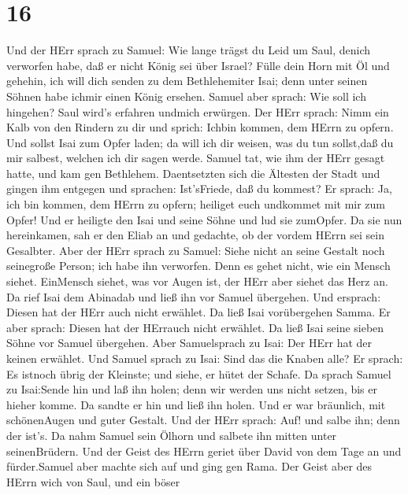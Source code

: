 \hypertarget{section-15}{%
\section{16}\label{section-15}}

 Und der HErr sprach zu Samuel: Wie lange trägst du Leid um
Saul, denich verworfen habe, daß er nicht König sei über Israel? Fülle
dein Horn mit Öl und gehehin, ich will dich senden zu dem Bethlehemiter
Isai; denn unter seinen Söhnen habe ichmir einen König ersehen.
 Samuel aber sprach: Wie soll ich hingehen? Saul wird's
erfahren undmich erwürgen. Der HErr sprach: Nimm ein Kalb von den
Rindern zu dir und sprich: Ichbin kommen, dem HErrn zu opfern.
 Und sollst Isai zum Opfer laden; da will ich dir weisen,
was du tun sollst,daß du mir salbest, welchen ich dir sagen werde.
 Samuel tat, wie ihm der HErr gesagt hatte, und kam gen
Bethlehem. Daentsetzten sich die Ältesten der Stadt und gingen ihm
entgegen und sprachen: Ist'sFriede, daß du kommest?  Er
sprach: Ja, ich bin kommen, dem HErrn zu opfern; heiliget euch undkommet
mit mir zum Opfer! Und er heiligte den Isai und seine Söhne und lud sie
zumOpfer.  Da sie nun hereinkamen, sah er den Eliab an und
gedachte, ob der vordem HErrn sei sein Gesalbter.  Aber der
HErr sprach zu Samuel: Siehe nicht an seine Gestalt noch seinegroße
Person; ich habe ihn verworfen. Denn es gehet nicht, wie ein Mensch
siehet. EinMensch siehet, was vor Augen ist, der HErr aber siehet das
Herz an.  Da rief Isai dem Abinadab und ließ ihn vor Samuel
übergehen. Und ersprach: Diesen hat der HErr auch nicht erwählet.
 Da ließ Isai vorübergehen Samma. Er aber sprach: Diesen hat
der HErrauch nicht erwählet.  Da ließ Isai seine sieben
Söhne vor Samuel übergehen. Aber Samuelsprach zu Isai: Der HErr hat der
keinen erwählet.  Und Samuel sprach zu Isai: Sind das die
Knaben alle? Er sprach: Es istnoch übrig der Kleinste; und siehe, er
hütet der Schafe. Da sprach Samuel zu Isai:Sende hin und laß ihn holen;
denn wir werden uns nicht setzen, bis er hieher komme.  Da
sandte er hin und ließ ihn holen. Und er war bräunlich, mit schönenAugen
und guter Gestalt. Und der HErr sprach: Auf! und salbe ihn; denn der
ist's.  Da nahm Samuel sein Ölhorn und salbete ihn mitten
unter seinenBrüdern. Und der Geist des HErrn geriet über David von dem
Tage an und fürder.Samuel aber machte sich auf und ging gen Rama.
 Der Geist aber des HErrn wich von Saul, und ein böser
